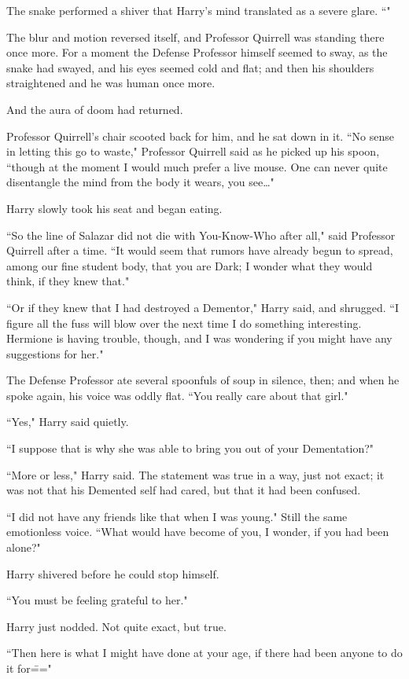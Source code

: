 The snake performed a shiver that Harry's mind translated as a severe glare. ``"

The blur and motion reversed itself, and Professor Quirrell was standing there once more. For a moment the Defense Professor himself seemed to sway, as the snake had swayed, and his eyes seemed cold and flat; and then his shoulders straightened and he was human once more.

And the aura of doom had returned.

Professor Quirrell's chair scooted back for him, and he sat down in it. ``No sense in letting this go to waste," Professor Quirrell said as he picked up his spoon, ``though at the moment I would much prefer a live mouse. One can never quite disentangle the mind from the body it wears, you see{\ldots}"

Harry slowly took his seat and began eating.

\later

``So the line of Salazar did not die with You-Know-Who after all," said Professor Quirrell after a time. ``It would seem that rumors have already begun to spread, among our fine student body, that you are Dark; I wonder what they would think, if they knew that."

``Or if they knew that I had destroyed a Dementor," Harry said, and shrugged. ``I figure all the fuss will blow over the next time I do something interesting. Hermione is having trouble, though, and I was wondering if you might have any suggestions for her."

The Defense Professor ate several spoonfuls of soup in silence, then; and when he spoke again, his voice was oddly flat. ``You really care about that girl."

``Yes," Harry said quietly.

``I suppose that is why she was able to bring you out of your Dementation?"

``More or less," Harry said. The statement was true in a way, just not exact; it was not that his Demented self had cared, but that it had been confused.

``I did not have any friends like that when I was young." Still the same emotionless voice. ``What would have become of you, I wonder, if you had been alone?"

Harry shivered before he could stop himself.

``You must be feeling grateful to her."

Harry just nodded. Not quite exact, but true.

``Then here is what I might have done at your age, if there had been anyone to do it for\==="

